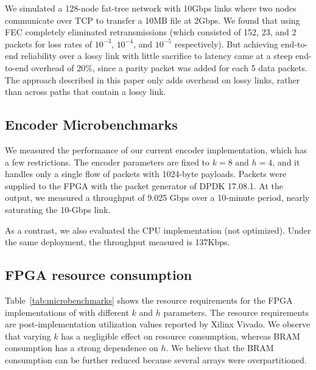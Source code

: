 We simulated a 128-node fat-tree network with 10Gbps links where two
nodes communicate over TCP to transfer a 10MB file at 2Gbps. We found
that using FEC completely eliminated retransmissions (which consisted
  of 152, 23, and 2 packets for loss rates of $10^{-3}$, $10^{-4}$,
and $10^{-5}$ respectively). But achieving end-to-end reliability
over a lossy link with little sacrifice to latency came at a steep
end-to-end overhead of 20\%, since a parity packet was added for each
5 data packets. The approach described in this paper only adds
overhead on lossy links, rather than across paths that contain a
lossy link.


\subsection{Encoder Microbenchmarks}
\iffalse
Here we evaluate the implementation directly, not using a model.
Latency and throughput graphs for experiments involving different loss rates, and the encoder working on the CPU and FPGA.
Note: we have not optimized the CPU implementation.
\fi
We measured the performance of our current encoder implementation, which has a
few restrictions.  The encoder parameters are fixed to $k = 8$ and $h = 4$,
and it handles only a single flow of packets with 1024-byte payloads.
Packets were supplied to the FPGA with the packet generator of DPDK 17.08.1.
At the output, we measured a throughput of 9.025 Gbps over a 10-minute period,
nearly saturating the 10-Gbps link.

\iffalse
To ensure \OurSys's effect observed in the model are practical, we directly measured the 
full throughput of our encoder implementation in FPGA. For our benchmark, the encoder is configured to use
k=8 and h=4. Packets are generated by a tool based
on DPDK library, and are fed to the board (as is specified above~(\S\ref{sec:implementation})) through
a 10Gbps link. The average outgoing throughput measured during a 10 minutes test is 9.025Gbps.
Considering the overhead from other parts of the system, we believe the link is actually close
to being saturated, which is our basic assumption in evaluations.
\fi

As a contrast, we also evaluated the CPU implementation (not optimized). Under the same deployment, the throughput measured is 137Kbps.


\subsection{FPGA resource consumption}
Table~\ref{tab:microbenchmarks} shows the resource requirements for the FPGA implementations of
\OurSys with different $k$ and $h$ parameters.  The resource requirements are
post-implementation utilization values reported by Xilinx Vivado.  We observe
that varying $k$ has a negligible effect on resource consumption, whereas BRAM
consumption has a strong dependence on $h$.  We believe that the BRAM consumption
can be further reduced because several arrays were overpartitioned.

